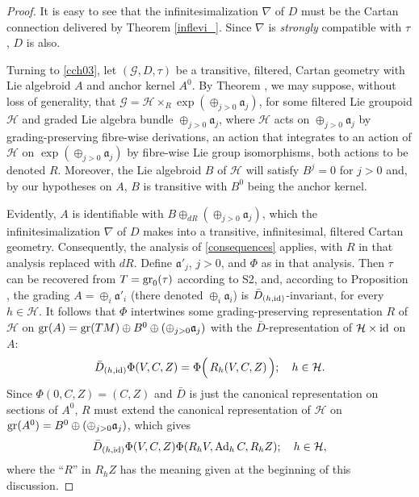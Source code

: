\documentclass[leqno,12pt]{amsart} %
\begin{document}
\begin{proof}
  It is easy to see that the infinitesimalization $\nabla $ of $D$ must be the Cartan
  connection delivered by Theorem \ref{inflevi_}. Since $\nabla $ is {\em strongly}
  compatible with $\tau $, $D$ is also.

  Turning to \eqref{cch03}, let $({\mathcal G}, D, \tau)$ be a transitive, filtered, Cartan
  geometry with Lie algebroid $A$ and anchor kernel $A^0$. By Theorem ,
  we may suppose, without loss of generality, that
  ${\mathcal G} = {\mathcal H} \times_R\exp(\oplus_{j>0}{\mathfrak a}_j)$, for some
  filtered Lie groupoid ${\mathcal H}$ and graded Lie algebra bundle
  $\oplus_{j>0}{\mathfrak a}_j$, where ${\mathcal H} $ acts on
  $\oplus_{j>0}{\mathfrak a}_j$ by grading-preserving fibre-wise derivations, an action
  that integrates to an action of ${\mathcal H} $ on $\exp(\oplus_{j>0}{\mathfrak a}_j)$
  by fibre-wise Lie group isomorphisms, both actions to be denoted $R$. Moreover, the Lie
  algebroid $B$ of ${\mathcal H} $ will satisfy $B^j=0$ for $j>0$ and, by our hypotheses
  on $A$, $B$ is transitive with $B^0$ being the anchor kernel.

  Evidently, $A$ is identifiable with $B \oplus_{dR}(\oplus_{j>0}{\mathfrak a}_j)$, which
  the infinitesimalization $\nabla $ of $D$ makes into a transitive, infinitesimal,
  filtered Cartan geometry. Consequently, the analysis of \ref{consequences} applies, with
  $R$ in that analysis replaced with $dR$. Define ${\mathfrak a}'_j $, $j>0$, and $\Phi$
  as in that analysis. Then $\tau $ can be recovered from $T=\operatorname{\operatorname{gr}}_0(\tau)$ according to
  S2, and, according to Proposition , the grading
  $A=\oplus_i {\mathfrak a}'_i$ (there denoted $\oplus_i {\mathfrak a}_i$) is
  $\bar D_{(h,\mathrm{id})}$-invariant, for every $h \in {\mathcal H} $. It follows that
  $\Phi $ intertwines some grading-preserving representation $R$ of ${\mathcal H}$ on
  $\operatorname{\operatorname{gr}}(A)=\operatorname{\operatorname{gr}}(TM)\oplus B^0 \oplus (\oplus_{j>0}{\mathfrak a}_j)$ with the
  $\bar D$-representation of ${\mathcal H} \times \mathrm{id}$ on $A$:
  \begin{equation}
    \bar D_{(h, \mathrm{id})} \Phi(V,C,Z) = \Phi\Big(\,R_h(V, C, Z)\,\Big);\quad h \in {\mathcal H}.
  \end{equation}
  Since $\Phi(0, C, Z) = (C, Z)$ and $\bar D $ is just the canonical
  representation on sections of $A^0$, $R$ must extend the canonical representation of
  ${\mathcal H}$ on $\operatorname{\operatorname{gr}}(A^0) = B^0 \oplus(\oplus_{j>0} {\mathfrak a}_j) $, which
  gives
  \begin{equation}
    \bar D_{(h, \mathrm{id})} \Phi(V,C,Z)\Phi(R_hV, \operatorname{Ad}_hC, R_h Z);\quad h \in {\mathcal H},\label{cab1}
  \end{equation}
  where the ``$R$'' in $R_hZ$ has the meaning given at the beginning of this discussion.


\end{proof}
\end{document}
